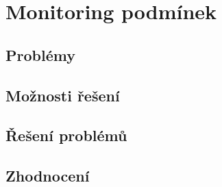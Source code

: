 \section{Monitoring podmínek}\label{sec:monitoring-podminek}
\subsection{Problémy}\label{subsec:monitoring-podminek-problemy}
\subsection{Možnosti řešení}\label{subsec:monitoring-podminek-moznosti-reseni}
\subsection{Řešení problémů}\label{subsec:monitoring-podminek-reseni-problemu}
\subsection{Zhodnocení}\label{subsec:monitoring-podminek-zhodnoceni}
